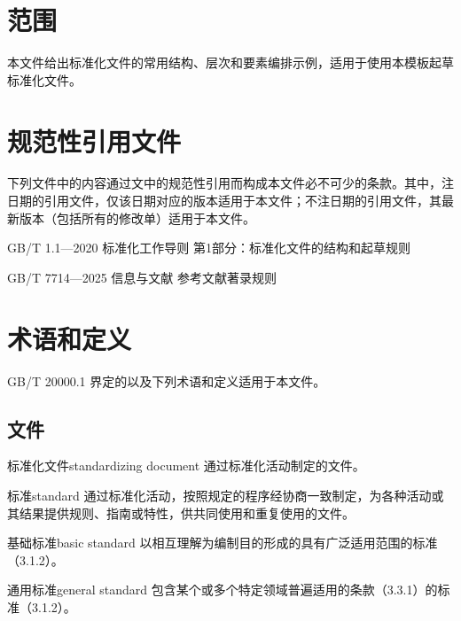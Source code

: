 
\chapter{范围}
本文件给出标准化文件的常用结构、层次和要素编排示例，适用于使用本模板起草标准化文件。

\chapter{规范性引用文件}
下列文件中的内容通过文中的规范性引用而构成本文件必不可少的条款。其中，注日期的引用文件，仅该日期对应的版本适用于本文件；不注日期的引用文件，其最新版本（包括所有的修改单）适用于本文件。

GB/T 1.1—2020 标准化工作导则 第1部分：标准化文件的结构和起草规则

GB/T 7714—2025 信息与文献 参考文献著录规则

\chapter{术语和定义}
GB/T 20000.1 界定的以及下列术语和定义适用于本文件。

\section{文件}
\begin{term}[subsection]{标准化文件}{standardizing document}
通过标准化活动制定的文件。
\end{term}

\begin{term}[subsection]{标准}{standard}
通过标准化活动，按照规定的程序经协商一致制定，为各种活动或其结果提供规则、指南或特性，供共同使用和重复使用的文件。
\end{term}

\begin{term}[subsection]{基础标准}{basic standard}
以相互理解为编制目的形成的具有广泛适用范围的标准（3.1.2）。
\end{term}

\begin{term}[subsection]{通用标准}{general standard}
包含某个或多个特定领域普遍适用的条款（3.3.1）的标准（3.1.2）。
\end{term}

